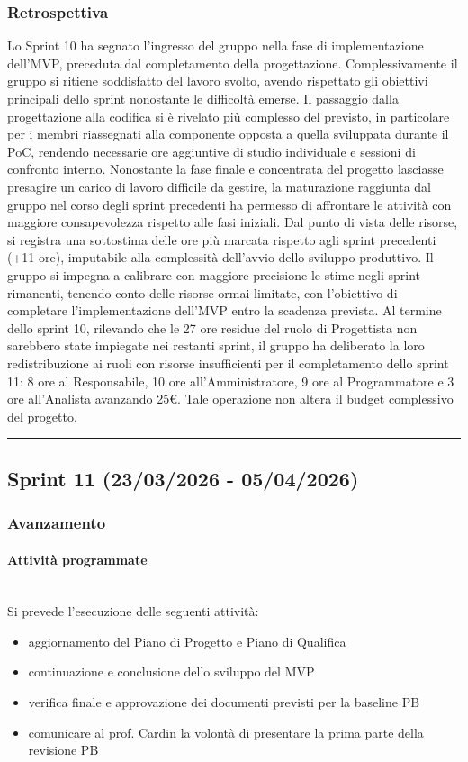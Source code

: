 \documentclass[10pt, letterpaper]{article}
\newcommand{\trisubsection}[1]{\paragraph{#1}\mbox{}\\}
\begin{document}
    \subsubsection{Retrospettiva}
Lo Sprint 10 ha segnato l'ingresso del gruppo nella fase di implementazione dell'MVP, preceduta dal completamento della progettazione. Complessivamente il gruppo si ritiene soddisfatto del lavoro svolto, avendo rispettato gli obiettivi principali dello sprint nonostante le difficoltà emerse.
Il passaggio dalla progettazione alla codifica si è rivelato più complesso del previsto, in particolare per i membri riassegnati alla componente opposta a quella sviluppata durante il PoC, rendendo necessarie ore aggiuntive di studio individuale e sessioni di confronto interno. Nonostante la fase finale e concentrata del progetto lasciasse presagire un carico di lavoro difficile da gestire, la maturazione raggiunta dal gruppo nel corso degli sprint precedenti ha permesso di affrontare le attività con maggiore consapevolezza rispetto alle fasi iniziali.
Dal punto di vista delle risorse, si registra una sottostima delle ore più marcata rispetto agli sprint precedenti (+11 ore), imputabile alla complessità dell'avvio dello sviluppo produttivo. Il gruppo si impegna a calibrare con maggiore precisione le stime negli sprint rimanenti, tenendo conto delle risorse ormai limitate, con l'obiettivo di completare l'implementazione dell'MVP entro la scadenza prevista.
Al termine dello sprint 10, rilevando che le 27 ore residue del ruolo di Progettista non sarebbero state impiegate nei restanti sprint, il gruppo ha deliberato la loro redistribuzione ai ruoli con risorse insufficienti per il completamento dello sprint 11: 8 ore al Responsabile, 10 ore all'Amministratore, 9 ore al Programmatore e 3 ore all'Analista avanzando 25€. Tale operazione non altera il budget complessivo del progetto.



\vspace{1em}
    \hrule
    \vspace{1em}

    \subsection{Sprint 11 (23/03/2026 - 05/04/2026)}
    \subsubsection{Avanzamento}
    \trisubsection{Attività programmate}
    Si prevede l'esecuzione delle seguenti attività:
    \begin{itemize}
        \item aggiornamento del Piano di Progetto e Piano di Qualifica 
        \item continuazione e conclusione dello sviluppo del MVP
        \item verifica finale e approvazione dei documenti previsti per la baseline PB
        \item comunicare al prof. Cardin la volontà di presentare la prima parte della revisione PB
    \end{itemize}
\end{document}
